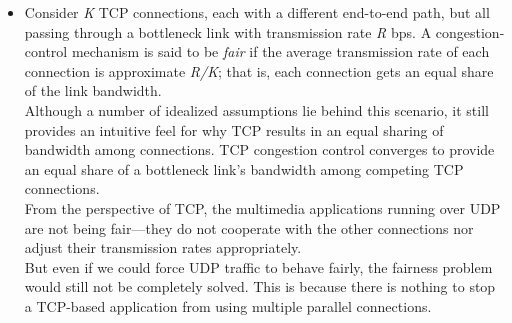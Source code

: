 \begin{itemize}
\item
Consider \textit{K} TCP connections, each with a different end-to-end path, but all passing through a bottleneck link with transmission rate \textit{R} bps. A congestion-control mechanism is said to be \textit{fair} if the average transmission rate of each connection is approximate \textit{R/K}; that is, each connection gets an equal share of the link bandwidth.\\
Although a number of idealized assumptions lie behind this scenario, it still provides an intuitive feel for why TCP results in an equal sharing of bandwidth among connections. TCP congestion control converges to provide an equal share of a bottleneck link's bandwidth among competing TCP connections.\\
From the perspective of TCP, the multimedia applications running over UDP are not being fair---they do not cooperate with the other connections nor adjust their transmission rates appropriately.\\
But even if we could force UDP traffic to behave fairly, the fairness problem would still not be completely solved. This is because there is nothing to stop a TCP-based application from using multiple parallel connections.

\end{itemize}
